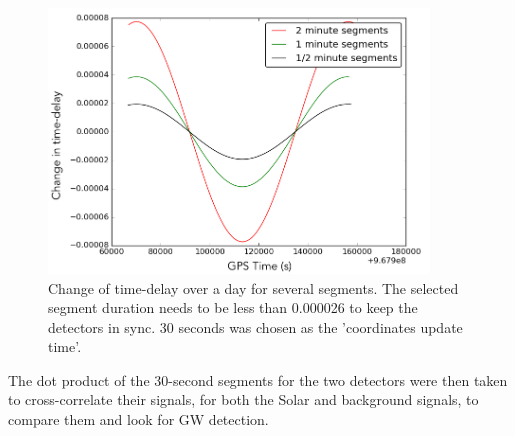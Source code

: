 \begin{figure}[htb]
\begin{center}
\includegraphics[width=0.9\textwidth]{ddt}
\caption{Change of time-delay over a day for several segments. The selected segment duration needs to be less than 0.000026 to keep the detectors in sync. 30 seconds was chosen as the 'coordinates update time'.}
\label{ddt}
\end{center}
\end{figure}\par{}
\par{}
The dot product of the 30-second segments for the two detectors were then taken to cross-correlate their signals, for both the Solar and background signals, to compare them and look for GW detection.
